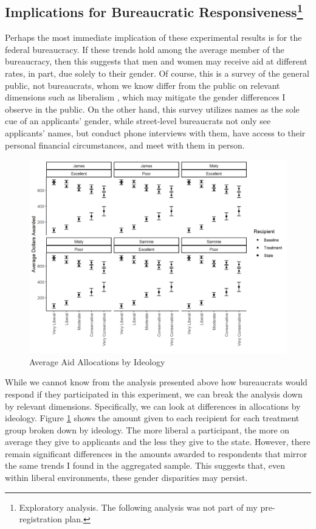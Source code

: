 \documentclass[12pt]{article}%
\begin{document}
\begin{doublespace}
\section*{Implications for Bureaucratic Responsiveness\footnote{Exploratory analysis. The following analysis was not part of my pre-registration plan.}}
Perhaps the most immediate implication of these experimental results is for the federal bureaucracy. If these trends hold among the average member of the bureaucracy, then this suggests that men and women may receive aid at different rates, in part, due solely to their gender. Of course, this is a survey of the general public, not bureaucrats, whom we know differ from the public on relevant dimensions such as liberalism \citep{spenkuch_ideology_2021}, which may mitigate the gender differences I observe in the public. On the other hand, this survey utilizes names as the sole cue of an applicants’ gender, while street-level bureaucrats not only see applicants’ names, but conduct phone interviews with them, have access to their personal financial circumstances, and meet with them in person.

\begin{figure}[H]
	\centering
	\includegraphics[scale=.8]{figs/robust_result_ideo.png}
	\caption{Average Aid Allocations by Ideology}
	\label{ideology}
\end{figure}


While we cannot know from the analysis presented above how bureaucrats would respond if they participated in this experiment, we can break the analysis down by relevant dimensions. Specifically, we can look at differences in allocations by ideology. Figure \ref{ideology} shows the amount given to each recipient for each treatment group broken down by ideology. The more liberal a participant, the more on average they give to applicants and the less they give to the state. However, there remain significant differences in the amounts awarded to respondents that mirror the same trends I found in the aggregated sample. This suggests that, even within liberal environments, these gender disparities may persist.


\end{doublespace}
\end{document}
